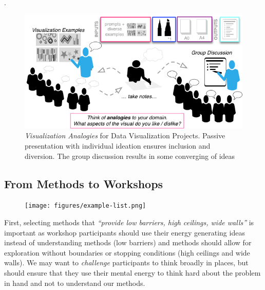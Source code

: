 . 

\begin{figure}[t]
    \centering
    \includegraphics[width=\columnwidth]{figures/vis-aware-process}
    \caption{ \emph{Visualization Analogies} for Data Visualization Projects.
    Passive presentation with individual ideation ensures inclusion and diversion. The group discussion results in some converging of ideas}
    \label{fig:vis-aware-process}
\end{figure}

\subsection{From Methods to Workshops}

\begin{figure}
    \centering
    \texttt{[image: figures/example-list.png]}
    \caption{}
    \label{fig:example-list}
\end{figure}


First, selecting methods that \emph{``provide low barriers, high ceilings, wide walls''} is important as workshop participants should use their energy generating ideas instead of understanding methods (low barriers) and methods should allow for exploration without boundaries or stopping conditions (high ceilings and wide walls). We may want to \emph{challenge} participants to think broadly in places, but should ensure that they use their mental energy to think hard about the problem in hand and not to understand our methods.

